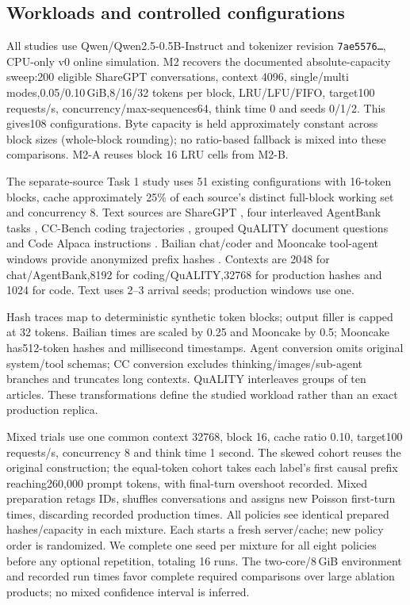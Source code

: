 \documentclass{article}
\begin{document}
\subsection{Workloads and controlled configurations}
All studies use Qwen/Qwen2.5-0.5B-Instruct and tokenizer revision \texttt{7ae5576\ldots}, CPU-only v0 online simulation. M2 recovers the documented absolute-capacity sweep:200 eligible ShareGPT conversations, context 4096, single/multi modes,0.05/0.10\,GiB,8/16/32 tokens per block, LRU/LFU/FIFO, target100 requests/s, concurrency/max-sequences64, think time 0 and seeds 0/1/2. This gives108 configurations. Byte capacity is held approximately constant across block sizes (whole-block rounding); no ratio-based fallback is mixed into these comparisons. M2-A reuses block 16 LRU cells from M2-B.

The separate-source Task 1 study uses 51 existing configurations with 16-token blocks, cache approximately 25\% of each source's distinct full-block working set and concurrency 8. Text sources are ShareGPT \citep{sharegpt}, four interleaved AgentBank tasks \citep{agentbank}, CC-Bench coding trajectories \citep{ccbench}, grouped QuALITY document questions \citep{quality} and Code Alpaca instructions \citep{codealpaca}. Bailian chat/coder and Mooncake tool-agent windows provide anonymized prefix hashes \citep{bailian,mooncake}. Contexts are 2048 for chat/AgentBank,8192 for coding/QuALITY,32768 for production hashes and 1024 for code. Text uses 2--3 arrival seeds; production windows use one.

Hash traces map to deterministic synthetic token blocks; output filler is capped at 32 tokens. Bailian times are scaled by 0.25 and Mooncake by 0.5; Mooncake has512-token hashes and millisecond timestamps. Agent conversion omits original system/tool schemas; CC conversion excludes thinking/images/sub-agent branches and truncates long contexts. QuALITY interleaves groups of ten articles. These transformations define the studied workload rather than an exact production replica.

Mixed trials use one common context 32768, block 16, cache ratio 0.10, target100 requests/s, concurrency 8 and think time 1 second. The skewed cohort reuses the original construction; the equal-token cohort takes each label's first causal prefix reaching260,000 prompt tokens, with final-turn overshoot recorded. Mixed preparation retags IDs, shuffles conversations and assigns new Poisson first-turn times, discarding recorded production times. All policies see identical prepared hashes/capacity in each mixture. Each starts a fresh server/cache; new policy order is randomized. We complete one seed per mixture for all eight policies before any optional repetition, totaling 16 runs. The two-core/8\,GiB environment and recorded run times favor complete required comparisons over large ablation products; no mixed confidence interval is inferred.
\end{document}
